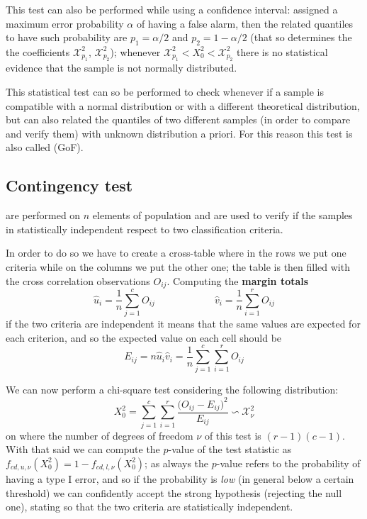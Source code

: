 	This test can also be performed while using a confidence interval: assigned a maximum error probability $\alpha$ of having a false alarm, then the related quantiles to have such probability are $p_1 = \alpha/2$ and $p_2 = 1-\alpha/2$ (that so determines the the coefficients $\mathcal X^2_{p_1}$, $\mathcal X^2_{p_2}$); whenever $\mathcal X^2_{p_1} < X_0^2 < \mathcal X^2_{p_2}$ there is no statistical evidence that the sample is not normally distributed.

	This statistical test can so be performed to check whenever if a sample is compatible with a normal distribution or with a different theoretical distribution, but can also related the quantiles of two different samples (in order to compare and verify them) with unknown distribution a priori. For this reason this test is also called  (GoF). 	
	
\subsection{Contingency test}
	 are performed on $n$ elements of population and are used to verify if the samples in statistically independent respect to two classification criteria.
	
	In order to do so we have to create a cross-table where in the rows we put one criteria while on the columns we put the other one; the table is then filled with the cross correlation observations $O_{ij}$. Computing the \textbf{margin totals}
	\[ \hat u_i = \frac 1 n \sum_{j=1}^{c} O_{ij} \qquad \qquad \qquad \hat v_i = \frac 1 n \sum_{i=1}^{r} O_{ij} \]	
	if the two criteria are independent it means that the same values are expected for each criterion, and so the expected value on each cell should be
	\[ E_{ij} = n \hat u_i \hat v_i = \frac 1 n  \sum_{j=1}^{c} \sum_{i=1}^{r} O_{ij}  \]
	
	We can now perform a chi-square test considering the following distribution:
	\begin{equation}
		 X_0^2 = \sum_{j=1}^{c} \sum_{i=1}^{r} \frac{\big(O_{ij}-E_{ij}\big)^2}{E_{ij}} \backsim \mathcal X^2_\nu
	\end{equation}
	on where the number of degrees of freedom $\nu$ of this test is $(r-1)(c-1)$. With that said we can compute the $p$-value of the test statistic as $f_{cd,u,\nu}(X_0^2) = 1- f_{cd,l,\nu}(X_0^2)$; as always the $p$-value refers to the probability of having a type I error, and so if the probability is \textit{low} (in general below a certain threshold) we can confidently accept the strong hypothesis (rejecting the null one), stating so that the two criteria are statistically independent.
	                
